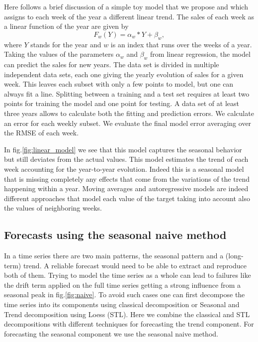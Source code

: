 \documentclass[12pt, letterpaper]{article}\usepackage[]{graphicx}\usepackage[]{color}
\begin{document}
Here follows a brief discussion of a simple toy model that we propose and which assigns to each week of the year a different linear trend. The sales of each week as a linear function of the year are given by
\begin{equation}
F_w(Y) = \alpha_w*Y+\beta_w ,
\end{equation}
where $Y$ stands for the year and $w$ is an index that runs over the weeks of a year. Taking the values of the parameters $\alpha_w$ and $\beta_w$ from linear regression, the model can predict the sales for new years. The data set is divided in multiple independent data sets, each one giving the yearly evolution of sales for a given week. This leaves each subset with only a few points to model, but one can always fit a line. Splitting between a training and a test set requires at least two points for training the model and one point for testing. A data set of at least three years allows to calculate both the fitting and prediction errors. We calculate an error for each weekly subset. We evaluate the final model error averaging over the RMSE of each week. 

In fig.\ref{fig:linear_model} we see that this model captures the seasonal behavior but still deviates from the actual values. This model estimates the trend of each week accounting for the year-to-year evolution. Indeed this is a seasonal model that is missing completely any effects that come from the variations of the trend happening within a year. Moving averages and autoregressive models are indeed different approaches that model each value of the target taking into account also the values of neighboring weeks. 

\subsection{Forecasts using the seasonal naive method}

In a time series there are two main patterns, the seasonal pattern and a (long-term) trend. A reliable forecast would need to be able to extract and reproduce both of them. Trying to model the time series as a whole can lead to failures like the drift term applied on the full time series getting a strong influence from a seasonal peak in fig.\ref{fig:naive}. To avoid such cases one can first decompose the time series into its components using classical decomposition\cite{Hyndman_book} or Seasonal and Trend decomposition using Loess (STL)\cite{STL}. Here we combine the classical and STL decompositions with different techniques for forecasting the trend component. For forecasting the seasonal component we use the seasonal naive method.
\end{document}
